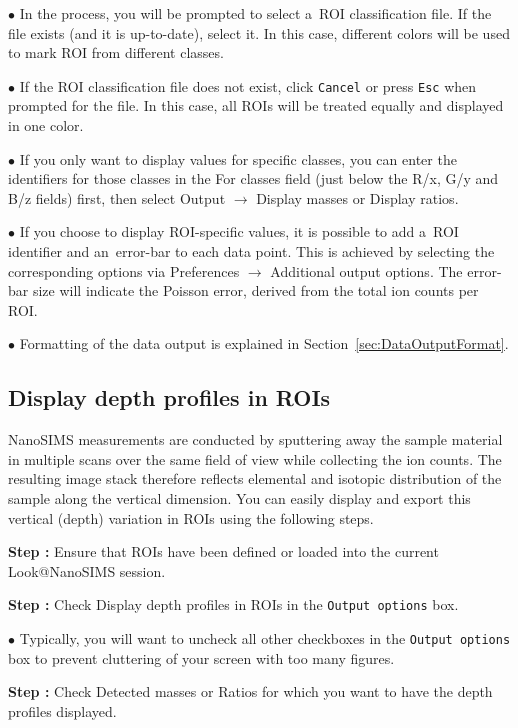 \documentclass[a4paper, 11pt]{article}
\newcommand{\ttt}[1]{\texttt{#1}}
\newcommand{\lans}[1]{{\color{magenta}#1}}
\newcommand{\lanscb}[1]{{\color{darkgreen}#1}}
\newcommand{\lanstf}[1]{{\color{cyan}#1}}
\newcommand\ra{\rightarrow}
\newcounter{step}
\newcommand\s{\addtocounter{step}{1}\noindent\textbf{Step \thestep:}{ }}
\newcommand\bul{\noindent$\bullet${ }}
\begin{document}
\bul In the process, you will be prompted to select a~ROI classification file. If the file exists (and it is up-to-date), select it. In this case, different colors will be used to mark ROI from different classes. 

\bul If the ROI classification file does not exist, click \ttt{Cancel} or press \ttt{Esc} when prompted for the file. In this case, all ROIs will be treated equally and displayed in one color.

\bul If you only want to display values for specific classes, you can enter the identifiers for those classes in the \lanstf{For classes} field (just below the R/x, G/y and B/z fields) first, then select \lans{Output} $\ra$ \lans{Display masses} or \lans{Display ratios}.

\bul If you choose to display ROI-specific values, it is possible to add a~ROI identifier and an~error-bar to each data point. This is achieved by selecting the corresponding options via \lans{Preferences} $\ra$ \lans{Additional output options}. The error-bar size will indicate the Poisson error, derived from the total ion counts per ROI.

\bul Formatting of the data output is explained in Section~\ref{sec:DataOutputFormat}.


\subsection{Display depth profiles in ROIs}
\setcounter{step}{0}

NanoSIMS measurements are conducted by sputtering away the sample material in multiple scans over the same field of view while collecting the ion counts. The resulting image stack therefore reflects elemental and isotopic distribution of the sample along the vertical dimension. You can easily display and export this vertical (depth) variation in ROIs using the following steps.

\s Ensure that ROIs have been defined or loaded into the current Look@NanoSIMS session.

\s Check \lanscb{Display depth profiles in ROIs} in the \ttt{Output options} box.

\bul Typically, you will want to uncheck all other checkboxes in the \ttt{Output options} box to prevent cluttering of your screen with too many figures.

\s Check \lanscb{Detected masses} or \lanscb{Ratios} for which you want to have the depth profiles displayed.
\end{document}

